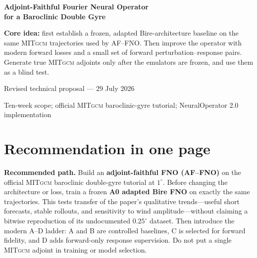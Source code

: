 \documentclass[11pt]{article}
\newcommand{\MITgcm}{\textsc{MITgcm}}
\newcommand{\AF}{AF--FNO}
\newenvironment{decisionbox}
  {\begin{center}\begin{lrbox}{\decisionstore}\begin{minipage}{0.92\textwidth}}
  {\end{minipage}\end{lrbox}\setlength{\fboxsep}{8pt}%
   \fcolorbox{teal}{lightteal}{\usebox{\decisionstore}}\end{center}}
\begin{document}
\begin{titlepage}
\centering\vspace*{0.9in}
{\sffamily\bfseries\color{navy}\fontsize{25}{30}\selectfont
Adjoint-Faithful Fourier Neural Operator\\[0.18in]
for a Baroclinic Double Gyre\par}
\vspace{0.3in}{\Large A minimum-data summer internship project plan\par}
\vspace{0.55in}
\begin{decisionbox}
\centering
\textbf{Core idea:} first establish a frozen, adapted Bire-architecture baseline on the
same \MITgcm{} trajectories used by \AF{}. Then improve the operator with modern
forward losses and a small set of forward perturbation--response pairs. Generate true
\MITgcm{} adjoints only after the emulators are frozen, and use them as a blind test.
\end{decisionbox}
\vfill
{\large Revised technical proposal --- 29 July 2026\par}\vspace{0.45in}
{\small Ten-week scope; official \MITgcm{} baroclinic-gyre tutorial;
NeuralOperator 2.0 implementation\par}
\end{titlepage}

\tableofcontents
\clearpage
{}

\section{Recommendation in one page}
\begin{decisionbox}
\textbf{Recommended path.} Build an \textbf{adjoint-faithful FNO (\AF)} on the official
\MITgcm{} baroclinic double-gyre tutorial at \(1^\circ\). Before changing the architecture
or loss, train a frozen \textbf{A0 adapted Bire FNO} on exactly the same trajectories.
This tests transfer of the paper's qualitative trends---useful short forecasts, stable
rollouts, and sensitivity to wind amplitude---without claiming a bitwise reproduction
of its undocumented \(0.25^\circ\) dataset. Then introduce the modern A--D ladder:
A and B are controlled baselines, C is selected for forward fidelity, and D adds
forward-only response supervision. Do not put a single \MITgcm{} adjoint in training or
model selection.
\end{decisionbox}
\end{document}
